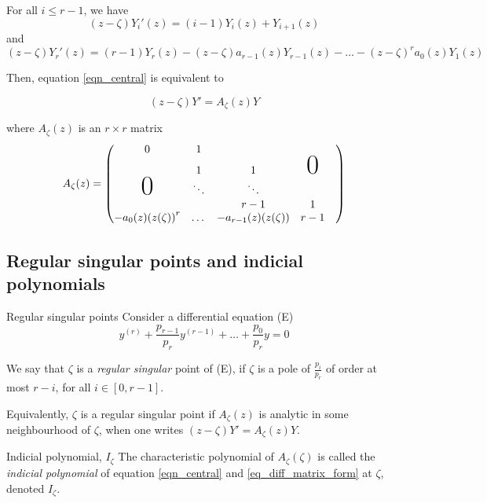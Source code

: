 \documentclass[../main.tex]{subfiles}
\begin{document}
For all $i \leq r - 1$, we have $${(z - \zeta)} Y_i'(z) = (i-1)Y_i(z) + Y_{i + 1}(z)$$ and
$$ {(z - \zeta)} Y_r'(z) = (r - 1)Y_r(z) - {(z - \zeta)} a_{r-1}(z) Y_{r - 1}(z) - \dots - {(z - \zeta)}^r a_0(z) Y_1(z) $$

Then, equation \eqref{eqn_central} is equivalent to

\begin{equation}\label{eq_diff_matrix_form}
{(z - \zeta)}Y' = A_\zeta(z)Y
\end{equation}

where $A_\zeta(z)$ is an $r \times r$ matrix
\begin{equation*}
A_\zeta(z)=
\begin{pmatrix}
0&1&&&\\
&1&1&\mbox{\Huge 0}\\
\mbox{\Huge 0}  & \ddots & \ddots  & &\\
 &  & r-1 & 1\\
-a_0(z){(z(\zeta))}^r & \dots & -a_{r-1}(z)(z(\zeta)) & r - 1
\end{pmatrix}
\end{equation*}

\subsection*{Regular singular points and indicial polynomials}


\begin{definition}{Regular singular points}
	Consider a differential equation (E)
	\begin{equation}
	y^{(r)} + \frac{p_{r-1}}{p_r} y^{(r - 1)} + \dots + \frac{p_0}{p_r} y = 0
	\end{equation}
	
	We say that $\zeta$ is a \emph{regular singular} point of (E), if $\zeta$ is a pole of $\frac{p_i}{p_r}$ of order at most $r - i$, for all $i \in [0, r - 1]$.
	
	Equivalently, $\zeta$ is a regular singular point if $A_\zeta(z)$ is analytic in some neighbourhood of $\zeta$, when one writes $(z - \zeta)Y' = A_\zeta(z) Y$.
\end{definition}

\begin{definition}{{Indicial polynomial, $I_\zeta$}}
	The characteristic polynomial of $A_\zeta(\zeta)$ is called the \emph{indicial polynomial} of equation \eqref{eqn_central} and \eqref{eq_diff_matrix_form} at $\zeta$, denoted $I_\zeta$.
\end{definition}
\end{document}
